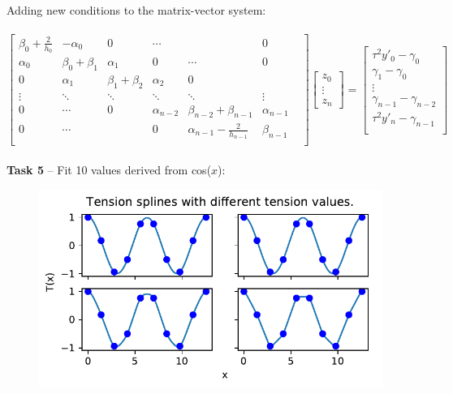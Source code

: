 \documentclass{article}
\newcommand{\T}[2]{\textbf{Task #1} -- #2:\\}
\begin{document}
  Adding new conditions to the matrix-vector system: \\ \ \\
  $
  \begin{bmatrix}
    \beta_0 + \frac{2}{h_0} & -\alpha_0 & 0 & \cdots & & 0 \\
  \alpha_0 & \beta_0 + \beta_1 & \alpha_1 & 0 & \cdots & 0 \\
  0 & \alpha_1 & \beta_1 + \beta_2 & \alpha_2 & 0 & \\
  \vdots & \ddots & \ddots & \ddots & \ddots &\vdots \\
  0 &  \cdots & 0 & \alpha_{n-2} & \beta_{n-2} + \beta_{n-1} & \alpha_{n-1} & \\
  0 & \cdots &  & 0 & \alpha_{n-1} - \frac{2}{h_{n-1}} & \beta_{n-1} \\
  \end{bmatrix}
  \begin{bmatrix}
    z_0 \\
    \vdots \\
    z_n
  \end{bmatrix}
  =
  \begin{bmatrix}
    \tau^2y'_0-\gamma_0 \\
   \gamma_1 - \gamma_0\\
    \vdots \\
    \gamma_{n-1} - \gamma_{n-2}\\
    \tau^2y'_n-\gamma_{n-1}\\
  \end{bmatrix}
  $ \\ \ \\

\T{5}{Fit 10 values derived from cos($x$)}

  \begin{figure}[!ht]
    \center
    \includegraphics{figs/p2-fit-10-points.pdf}
  \end{figure}
\end{document}
